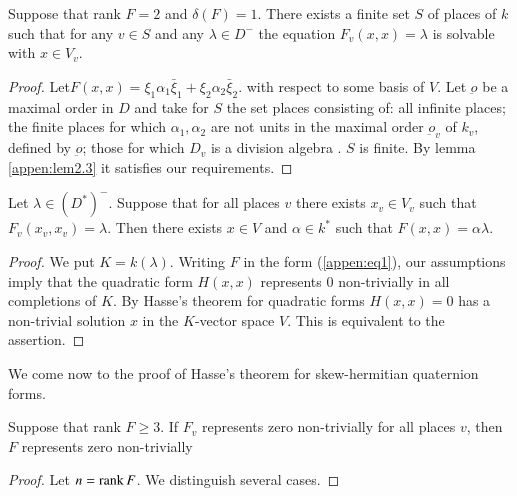 \setcounter{section}{3}
\setcounter{lemma}{0}
\begin{lemma}\label{appen:lem3.1}%
 Suppose that rank $F=2$ and $\delta (F)=1$. There exists a finite
  set $S$ of places of $k$ such that for any $v \in S$ and any
  $\lambda \in D^-$ the equation $F_v(x,x)=\lambda$ is solvable with
  $x \in V_v$.  
 \end{lemma} 

 \begin{proof}
Let\pageoriginale $F(x,x)= \xi_1 \alpha_1 \bar{\xi}_1 + \xi_2 \alpha_2
\bar{\xi}_2$. with respect to some basis of $V$. Let $\underbar{o}$ be
a maximal order in $D$ and take for $S$ the set places consisting of:
all infinite places; the finite places for which $\alpha_1, \alpha_2$
are not units in the maximal order $\underbar{o}_v$ of $k_v$, defined
by $\underbar{o}$; those for which $D_v$ is a division algebra . $S$
is finite. By lemma \ref{appen:lem2.3} it satisfies our requirements. 
  \end{proof} 

\setcounter{prop}{1}
 \begin{prop}\label{appen:prop3.2}
 Let $\lambda \in (D^*)^-$. Suppose that for all places $v$ there
  exists $x_v \in V_v$ such that $F_v(x_v,x_v)=\lambda$. Then there
  exists $x \in V$ and $\alpha \in k^*$ such that $F(x,x)=\alpha
  \lambda$. 
 \end{prop} 

 \begin{proof}
We put $K=k(\lambda)$. Writing $F$ in the form (\ref{appen:eq1}), our assumptions
imply that the quadratic form $H(x,x)$ represents 0 non-trivially in
all completions of $K$. By Hasse's theorem for quadratic forms
$H(x,x)=0$ has a non-trivial solution $x$ in the $K$-vector space
$V$. This is equivalent to the assertion. 
 \end{proof} 
 
 We come now to the proof of Hasse's theorem for skew-hermitian
 quaternion forms. 

\setcounter{theorem}{2}
 \begin{theorem}\label{appen:thm3.3}%
 Suppose that rank $F \ge 3$. If $F_v$ represents zero
  non-trivially for all places $v$, then $F$ represents zero
  non-trivially 
 \end{theorem} 

 \begin{proof}
Let $n= \operatorname{rank} F$. We distinguish several cases.
 \end{proof}

